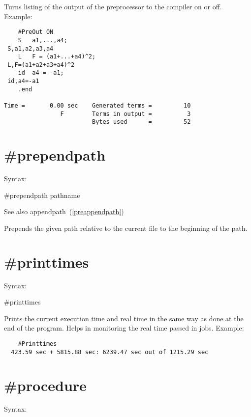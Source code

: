 \noindent Turns listing of the output of the preprocessor 
to the compiler on or off. Example:
\begin{verbatim}
    #PreOut ON
    S   a1,...,a4;
 S,a1,a2,a3,a4
    L   F = (a1+...+a4)^2;
 L,F=(a1+a2+a3+a4)^2
    id  a4 = -a1;
 id,a4=-a1
    .end

Time =       0.00 sec    Generated terms =         10
                F        Terms in output =          3
                         Bytes used      =         52
\end{verbatim}

 
\section{\#prependpath}
\label{preprependpath}

\noindent Syntax:

\#prependpath pathname

\noindent See also appendpath~(\ref{preappendpath})

\noindent Prepends the given path relative to the current file to the beginning
of the \FORM{} path.

 
\section{\#printtimes}
\label{preprinttimes}

\noindent Syntax:

\#printtimes

\noindent Prints the current execution time and real 
time in the same way as done at the end of the program. Helps in monitoring 
the real time passed in \TFORM{} jobs.
Example:
\begin{verbatim}
    #Printtimes
  423.59 sec + 5815.88 sec: 6239.47 sec out of 1215.29 sec
\end{verbatim}


\section{\#procedure}
\label{preprocedure}

\noindent Syntax:

